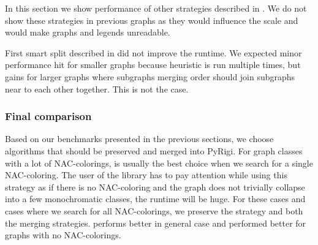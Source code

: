 In this section we show performance of other strategies described in .
We do not show these strategies in previous graphs as they would influence
the scale and would make graphs and legends unreadable.

First smart split described in 
did not improve the runtime.
We expected minor performance hit for smaller graphs because heuristic is run
multiple times, but gains for larger graphs where subgraphs merging order
should join subgraphs near to each other together. This is not the case.




\subsubsection{Final comparison}

Based on our benchmarks presented in the previous sections,
we choose algorithms that should be preserved and merged into PyRigi.
For graph classes with a lot of NAC-colorings,
\NaiveCycles{} is usually the best choice
when we search for a single NAC-coloring.
The user of the library has to pay attention while using this strategy
as if there is no NAC-coloring and the graph does not trivially collapse
into a few monochromatic classes, the runtime will be huge.
For these cases and cases where we search for all NAC-colorings,
we preserve the \NeighborsDegree{} strategy and both the merging strategies.
\MergeLinear{} performs better in general case and
\SharedVertices{} performed better for graphs with no NAC-colorings.

